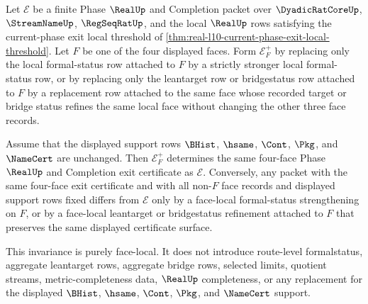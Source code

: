 \begin{theorem}
\label{thm:real-l10-face-local-formal-upgrade-invariance}
Let $\mathcal E$ be a finite Phase $\RealUp$ and Completion packet over $\DyadicRatCoreUp$, $\StreamNameUp$, $\RegSeqRatUp$, and the local $\RealUp$ rows satisfying the current-phase exit local threshold of \autoref{thm:real-l10-current-phase-exit-local-threshold}. Let $F$ be one of the four displayed faces. Form $\mathcal E_F^+$ by replacing only the local formal-status row attached to $F$ by a strictly stronger local formal-status row, or by replacing only the leantarget row or bridgestatus row attached to $F$ by a replacement row attached to the same face whose recorded target or bridge status refines the same local face without changing the other three face records.

Assume that the displayed support rows $\BHist$, $\hsame$, $\Cont$, $\Pkg$, and $\NameCert$ are unchanged. Then $\mathcal E_F^+$ determines the same four-face Phase $\RealUp$ and Completion exit certificate as $\mathcal E$. Conversely, any packet with the same four-face exit certificate and with all non-$F$ face records and displayed support rows fixed differs from $\mathcal E$ only by a face-local formal-status strengthening on $F$, or by a face-local leantarget or bridgestatus refinement attached to $F$ that preserves the same displayed certificate surface.

This invariance is purely face-local. It does not introduce route-level formalstatus, aggregate leantarget rows, aggregate bridge rows, selected limits, quotient streams, metric-completeness data, $\RealUp$ completeness, or any replacement for the displayed $\BHist$, $\hsame$, $\Cont$, $\Pkg$, and $\NameCert$ support.
\end{theorem}
